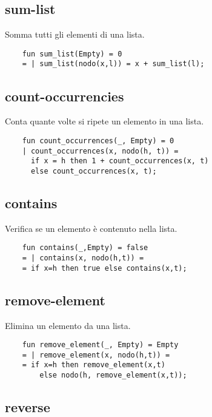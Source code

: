 \subsection{sum-list}

Somma tutti gli elementi di una lista.

\begin{lstlisting}
    fun sum_list(Empty) = 0
    = | sum_list(nodo(x,l)) = x + sum_list(l);
\end{lstlisting}

\subsection{count-occurrencies}

Conta quante volte si ripete un elemento in una lista.

\begin{lstlisting}
    fun count_occurrences(_, Empty) = 0
    | count_occurrences(x, nodo(h, t)) =
      if x = h then 1 + count_occurrences(x, t)
      else count_occurrences(x, t);
\end{lstlisting}

\subsection{contains}

Verifica se un elemento è contenuto nella lista.

\begin{lstlisting}
    fun contains(_,Empty) = false
    = | contains(x, nodo(h,t)) =
    = if x=h then true else contains(x,t);
\end{lstlisting}

\subsection{remove-element}

Elimina un elemento da una lista.

\begin{lstlisting}
    fun remove_element(_, Empty) = Empty
    = | remove_element(x, nodo(h,t)) =
    = if x=h then remove_element(x,t) 
        else nodo(h, remove_element(x,t));
\end{lstlisting}

\subsection{reverse}

